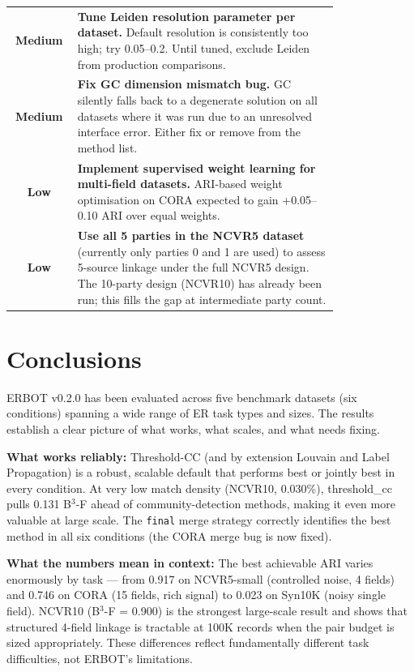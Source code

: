 \documentclass[11pt, a4paper]{article}
\begin{document}
\begin{table}[h!]
\begin{tabular}{cp{0.80\linewidth}}
{\color{medprio}\textbf{Medium}} &
  \textbf{Tune Leiden resolution parameter per dataset.}
  Default resolution is consistently too high; try 0.05--0.2. Until tuned,
  exclude Leiden from production comparisons. \\[4pt]
{\color{medprio}\textbf{Medium}} &
  \textbf{Fix GC dimension mismatch bug.}
  GC silently falls back to a degenerate solution on all datasets where it was run
  due to an unresolved interface error. Either fix or remove from the method list. \\[4pt]
{\color{lowprio}\textbf{Low}} &
  \textbf{Implement supervised weight learning for multi-field datasets.}
  ARI-based weight optimisation on CORA expected to gain +0.05--0.10 ARI over
  equal weights. \\[4pt]
{\color{lowprio}\textbf{Low}} &
  \textbf{Use all 5 parties in the NCVR5 dataset} (currently only parties 0 and 1
  are used) to assess 5-source linkage under the full NCVR5 design.
  The 10-party design (NCVR10) has already been run; this fills the gap at
  intermediate party count. \\
\bottomrule
\end{tabular}
\end{table}

\section{Conclusions}

ERBOT v0.2.0 has been evaluated across five benchmark datasets (six conditions)
spanning a wide range of ER task types and sizes. The results establish a clear
picture of what works, what scales, and what needs fixing.

\textbf{What works reliably:} Threshold-CC (and by extension Louvain and Label
Propagation) is a robust, scalable default that performs best or jointly best
in every condition. At very low match density (NCVR10, 0.030\%), threshold\_cc
pulls 0.131 B$^3$-F ahead of community-detection methods, making it even more
valuable at large scale. The \texttt{final} merge strategy correctly identifies
the best method in all six conditions (the CORA merge bug is now fixed).

\textbf{What the numbers mean in context:} The best achievable ARI varies
enormously by task --- from 0.917 on NCVR5-small (controlled noise, 4 fields)
and 0.746 on CORA (15 fields, rich signal) to 0.023 on Syn10K (noisy single
field). NCVR10 (B$^3$-F = 0.900) is the strongest large-scale result and shows
that structured 4-field linkage is tractable at 100K records when the pair
budget is sized appropriately. These differences reflect fundamentally different
task difficulties, not ERBOT's limitations.
\end{document}
